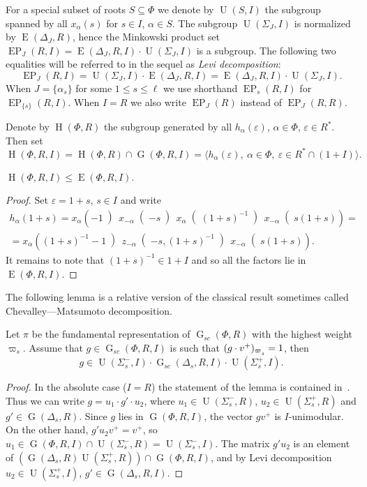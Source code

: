 \documentclass[12pt]{amsart}
\numberwithin{equation}{section}
\theoremstyle{definition}
\DeclareMathOperator{\G}{G}
\DeclareMathOperator{\E}{E}
\DeclareMathOperator{\EP}{EP}
\DeclareMathOperator{\Hh}{H}
\DeclareMathOperator{\U}{U}
\def\ssub#1{\mathchoice
   {_{\lower2pt\hbox{$\scriptstyle #1$}}}
   {_{\lower2pt\hbox{$\scriptstyle #1$}}}
   {_{\lower1.5pt\hbox{$\scriptscriptstyle #1$}}}
   {_{\!\lower1.5pt\hbox{$\scriptscriptstyle #1$}}}}
\begin{document}
For a special subset of roots $S\subseteq \Phi$ we denote by $\U(S, I)$ the subgroup spanned by all $x_{\alpha}(s)$ for $s\in I$, $\alpha\in S$.
The subgroup $\U(\Sigma_J, I)$ is normalized by $\E(\Delta_J, R)$, hence the Minkowski product set $\EP_J(R, I) = \E(\Delta_J, R, I) \cdot \U(\Sigma_J, I)$ is a subgroup. 
The following two equalities will be referred to in the sequel as {\it Levi decomposition}: 
\begin{equation} \label{rel:Levi-decomp} \EP_J(R, I) = \U(\Sigma_J, I) \cdot \E(\Delta_J, R, I) = \E(\Delta_J, R, I) \cdot \U(\Sigma_J, I). \end{equation}
When $J = \{ \alpha_s \}$ for some $1 \leq s\leq \ell$ we use shorthand $\EP_s(R, I)$ for $\EP_{\{s\}}(R, I)$.
When $I=R$ we also write $\EP_J(R)$ instead of $\EP_J(R, R)$.

Denote by $\Hh(\Phi,R)$ the subgroup generated by all $h_\alpha(\varepsilon)$, $\alpha\in\Phi$, $\varepsilon\in R^*$. Then set
\[ \Hh(\Phi,R,I) = \Hh(\Phi,R)\cap\G(\Phi,R,I)=\langle h_\alpha(\varepsilon),\ \alpha\in\Phi,\ \varepsilon\in R^*\cap(1+I)\rangle. \]
\begin{lemma}\label{lemma:rel-tor-elementary} $\Hh(\Phi,R,I)\leqslant\E(\Phi,R,I)$. \end{lemma}
\begin{proof}
Set $\varepsilon=1+s$, $s\in I$ and write
\begin{multline*}
h_\alpha(1+s) = x_\alpha\left(-1\middle)\, x_{-\alpha}\middle(-s\middle)\, x_\alpha\middle((1+s)^{-1}\middle)\, x_{-\alpha}\middle(s(1+s)\right) = \\
= x_\alpha\left((1+s)^{-1}-1\middle)\, z_{-\alpha}\middle(-s,(1+s)^{-1}\middle)\, x_{-\alpha}\middle(s(1+s)\right).
\end{multline*}
It remains to note that $(1+s)^{-1}\in 1+I$ and so all the factors lie in $\E(\Phi,R,I)$.
\end{proof}

The following lemma is a relative version of the classical result sometimes called Chevalley---Matsumoto decomposition.
\begin{lemma}\label{lemma:Chevalley-Matsumoto}
Let $\pi$ be the fundamental representation of $\G_{sc}(\Phi, R)$ with the highest weight $\varpi_s$.
Assume that $g\in \G_{sc}(\Phi, R, I)$ is such that $(g\cdot v^+)_{\varpi\ssub{s}}=1$, then 
\[ g \in \U(\Sigma_s^-, I) \cdot \G_{sc}(\Delta_s, R, I) \cdot \U(\Sigma_s^+, I). \]
\end{lemma}
\begin{proof}
In the absolute case ($I=R$) the statement of the lemma is contained in~\cite[Theorem~1.3]{St78}. Thus we can write $g=u_1\cdot g'\cdot u_2$, where $u_1\in\U(\Sigma_s^-,R)$, $u_2\in\U(\Sigma_s^+,R)$ and $g'\in\G(\Delta_s,R)$. Since $g$ lies in $\G(\Phi,R,I)$, the vector $gv^+$ is $I$-unimodular. On the other hand, $g'u_2v^+=v^+$, so $u_1\in\G(\Phi,R,I)\cap\U(\Sigma_s^-,R)=\U(\Sigma_s^-,I)$. The matrix $g'u_2$ is an element of $\left(\G(\Delta_s,R)\U(\Sigma_s^+,R)\right)\cap\G(\Phi,R,I)$, and by Levi decomposition $u_2\in\U(\Sigma_s^+,I)$, $g'\in\G(\Delta_s,R,I)$.
\end{proof}
\end{document}
